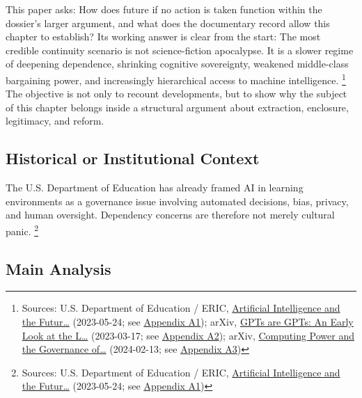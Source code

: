 \documentclass[
  american,
  11pt,
  letterpaper,
]{article}
\begin{document}
This paper asks: How does future if no action is taken function within
the dossier's larger argument, and what does the documentary record
allow this chapter to establish? Its working answer is clear from the
start: The most credible continuity scenario is not science-fiction
apocalypse. It is a slower regime of deepening dependence, shrinking
cognitive sovereignty, weakened middle-class bargaining power, and
increasingly hierarchical access to machine intelligence. \footnote{Sources:
  U.S. Department of Education / ERIC,
  \href{https://eric.ed.gov/?id=ED631097}{Artificial Intelligence and
  the Futur\ldots{}} (2023-05-24; see
  \hyperref[ch-09-appendix-a1-artificial-intelligence-and-the-future-of-teaching-and-learning-insights-and-recommendations]{Appendix
  A1}); arXiv, \href{https://arxiv.org/abs/2303.10130}{GPTs are GPTs: An
  Early Look at the L\ldots{}} (2023-03-17; see
  \hyperref[ch-09-appendix-a2-gpts-are-gpts-an-early-look-at-the-labor-market-impact-potential-of-large-language-models]{Appendix
  A2}); arXiv, \href{https://arxiv.org/abs/2402.08797}{Computing Power
  and the Governance of\ldots{}} (2024-02-13; see
  \hyperref[ch-09-appendix-a3-computing-power-and-the-governance-of-artificial-intelligence]{Appendix
  A3})} The objective is not only to recount developments, but to show
why the subject of this chapter belongs inside a structural argument
about extraction, enclosure, legitimacy, and reform.

\subsection{Historical or Institutional
Context}\label{historical-or-institutional-context-9}

The U.S. Department of Education has already framed AI in learning
environments as a governance issue involving automated decisions, bias,
privacy, and human oversight. Dependency concerns are therefore not
merely cultural panic. \footnote{Sources: U.S. Department of Education /
  ERIC, \href{https://eric.ed.gov/?id=ED631097}{Artificial Intelligence
  and the Futur\ldots{}} (2023-05-24; see
  \hyperref[ch-09-appendix-a1-artificial-intelligence-and-the-future-of-teaching-and-learning-insights-and-recommendations]{Appendix
  A1})}

\subsection{Main Analysis}\label{main-analysis-9}
\end{document}
